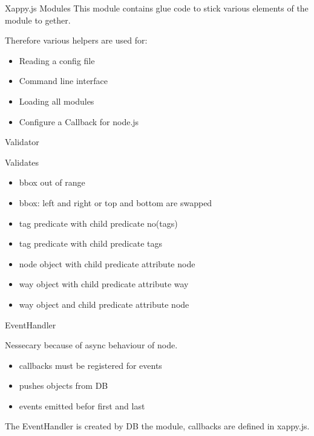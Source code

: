 \documentclass{beamer}
\begin{document}

\begin{frame}{Xappy.js Modules}
    This module contains glue code to stick various elements of the module to gether.

    Therefore various helpers are used for:

    \begin{itemize}
        \item Reading a config file
        \item Command line interface
        \item Loading all modules
        \item Configure a Callback for node.js
    \end{itemize}
\end{frame}

\begin{frame}{Validator}

    \begin{block}{Validates}
        \begin{itemize}
            \item bbox out of range
            \item bbox: left and right or top and bottom are swapped
            \item tag predicate with child predicate no(tags)
            \item tag predicate with child predicate tags
            \item node object with child predicate attribute node
            \item way object with child predicate attribute way
            \item way object and child predicate attribute node
        \end{itemize}
    \end{block}

\end{frame}


\begin{frame}{EventHandler}

    Nessecary because of async behaviour of node.

    \begin{itemize}
        \item callbacks must be registered for events
        \item pushes objects from DB
        \item events emitted befor first and last
    \end{itemize}

    The EventHandler is created by DB the module, callbacks are defined in xappy.js.

\end{frame}
\end{document}
